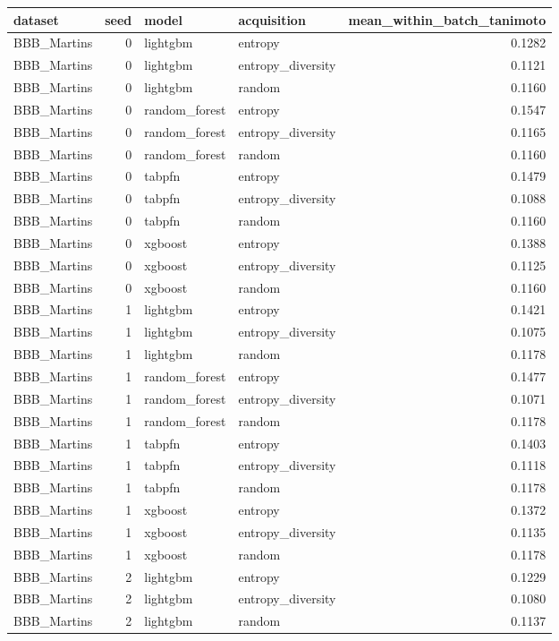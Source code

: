 \begin{tabular}{lrllr}
\toprule
dataset & seed & model & acquisition & mean_within_batch_tanimoto \\
\midrule
BBB_Martins & 0 & lightgbm & entropy & 0.1282 \\
BBB_Martins & 0 & lightgbm & entropy_diversity & 0.1121 \\
BBB_Martins & 0 & lightgbm & random & 0.1160 \\
BBB_Martins & 0 & random_forest & entropy & 0.1547 \\
BBB_Martins & 0 & random_forest & entropy_diversity & 0.1165 \\
BBB_Martins & 0 & random_forest & random & 0.1160 \\
BBB_Martins & 0 & tabpfn & entropy & 0.1479 \\
BBB_Martins & 0 & tabpfn & entropy_diversity & 0.1088 \\
BBB_Martins & 0 & tabpfn & random & 0.1160 \\
BBB_Martins & 0 & xgboost & entropy & 0.1388 \\
BBB_Martins & 0 & xgboost & entropy_diversity & 0.1125 \\
BBB_Martins & 0 & xgboost & random & 0.1160 \\
BBB_Martins & 1 & lightgbm & entropy & 0.1421 \\
BBB_Martins & 1 & lightgbm & entropy_diversity & 0.1075 \\
BBB_Martins & 1 & lightgbm & random & 0.1178 \\
BBB_Martins & 1 & random_forest & entropy & 0.1477 \\
BBB_Martins & 1 & random_forest & entropy_diversity & 0.1071 \\
BBB_Martins & 1 & random_forest & random & 0.1178 \\
BBB_Martins & 1 & tabpfn & entropy & 0.1403 \\
BBB_Martins & 1 & tabpfn & entropy_diversity & 0.1118 \\
BBB_Martins & 1 & tabpfn & random & 0.1178 \\
BBB_Martins & 1 & xgboost & entropy & 0.1372 \\
BBB_Martins & 1 & xgboost & entropy_diversity & 0.1135 \\
BBB_Martins & 1 & xgboost & random & 0.1178 \\
BBB_Martins & 2 & lightgbm & entropy & 0.1229 \\
BBB_Martins & 2 & lightgbm & entropy_diversity & 0.1080 \\
BBB_Martins & 2 & lightgbm & random & 0.1137 \\

\end{tabular}
